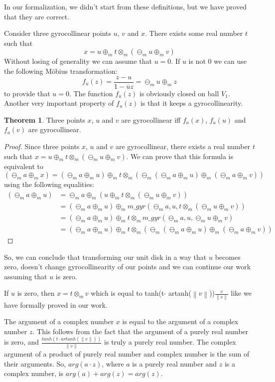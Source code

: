 \documentclass[a4paper]{article}
\theoremstyle{definition}
\newtheorem{theorem}{Theorem}[section]
\newcommand{\norm}[1]{\left\lVert#1\right\rVert}
\begin{document}
In our formalization, we didn't start from these definitions, but we have proved that they are correct.

Consider three gyrocollinear points $u$, $v$ and $x$. There exists some real number $t$ such that $$x=u\oplus_m t\otimes_m (\ominus_m u \oplus_m v)$$
Without losing of generality we can assume that $u=0$. If $u$ is not $0$ we can use the following M\" obius transformation:
$$f_u(z) = \frac{z-u}{1-\overline{u}z}=\ominus_m u \oplus_m z$$ to provide that $u=0$. The function $f_u(z)$ is obviously closed on ball $V_1$.
Another very important property of $f_u(z)$ is that it keeps a gyrocollinearity.

\begin{theorem}
Three points $x$, $u$ and $v$ are gyrocollinear iff $f_a(x)$, $f_a(u)$ and $f_a(v)$ are gyrocollinear.
\end{theorem}
\begin{proof} Since three points $x$, $u$ and $v$ are gyrocollinear, there exists a real number $t$ such that $x=u\oplus_m t\otimes_m (\ominus_m u \oplus_m v)$. We can prove that this formula is equivalent to $$(\ominus_m a \oplus_m x) = (\ominus_m a \oplus_m u) \oplus_m t \otimes_m (\ominus_m (\ominus_m a \oplus_m u) \oplus_m (\ominus_m a \oplus_m v))$$
using the following equalities:
\begin{align*} 
(\ominus_m a \oplus_m u) &=  \ominus_m a \oplus_m (u\oplus_m t \otimes_m (\ominus_m u \oplus_m v)) \\ 
 &=  (\ominus_m a \oplus_m u) \oplus_m m\_gyr (\ominus_m a, u, t\otimes_m (\ominus_m u \oplus_m v))\\
 &= (\ominus_m a \oplus_m u) \oplus_m t \otimes_m m\_gyr(\ominus_m a, u, \ominus_m u \oplus_m v)\\
 &= (\ominus_m a \oplus_m u) \oplus_m t \otimes_m (\ominus_m (\ominus_m a \oplus_m u) \oplus_m (\ominus_m a \oplus_m v))
\end{align*}
\end{proof}

So, we can conclude that transforming our unit disk in a way that $u$ becomes zero, doesn't change gyrocollinearity of our points and we can continue our work assuming that $u$ is zero.

If $u$ is zero, then $x=t\otimes_m v$ which is equal to tanh(t$\cdot$ artanh($\norm{v}$))$\frac{v}{\norm{v}}$ like we have formally proved in our work. 

The argument of a complex number $x$ is equal to the argument of a complex number $z$. This follows from the fact that the argument of a purely real number is zero, and $\frac{tanh(t\cdot artanh(\norm{v}))}{\norm{v}}$ is truly a purely real number. The complex argument of a product of purely real number and complex number is the sum of their arguments. So, $arg(a\cdot z)$, where $a$ is a purely real number and $z$ is a complex number, is $arg(a)+arg(z) = arg(z)$.  
\end{document}
